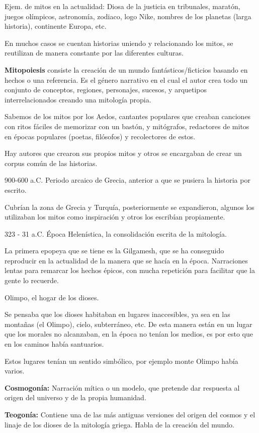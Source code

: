 Ejem. de mitos en la actualidad: Diosa de la justicia en tribunales, maratón, juegos olímpicos, astronomía, zodiaco, logo Nike, nombres de los planetas (larga historia), continente Europa, etc.

En muchos casos se cuentan historias uniendo y relacionando los mitos, se reutilizan de manera constante por las diferentes culturas.

\textbf{Mitopoiesis} consiste la creación de un mundo fantásticos/ficticios basando en hechos o una referencia. Es el género narrativo en el cual el autor crea todo un conjunto de conceptos, regiones, personajes, sucesos, y arquetipos interrelacionados creando una mitología propia.

Sabemos de los mitos por los Aedos, cantantes populares que creaban canciones con ritos fáciles de memorizar con un bastón, y mitógrafos, redactores de mitos en épocas populares (poetas, filósofos) y recolectores de estos.

Hay autores que crearon sus propios mitos y otros se encargaban de crear un corpus común de las historias.

900-600 a.C. Periodo arcaico de Grecia, anterior a que se pusiera la historia por escrito.

Cubrían la zona de Grecia y Turquía, posteriormente se expandieron, algunos los utilizaban los mitos como inspiración y otros los escribían propiamente.

323 - 31 a.C. Época Helenística, la consolidación escrita de la mitología.

La primera epopeya que se tiene es la Gilgamesh, que se ha conseguido reproducir en la actualidad de la manera que se hacía en la época. Narraciones lentas para remarcar los hechos épicos, con mucha repetición para facilitar que la gente lo recuerde.

Olimpo, el hogar de los dioses.

Se pensaba que los dioses habitaban en lugares inaccesibles, ya sea en las montañas (el Olimpo), cielo, subterráneo, etc. De esta manera están en un lugar que los morales no alcanzaban, en la época no tenían los medios, es por esto que en los caminos había santuarios.

Estos lugares tenían un sentido simbólico, por ejemplo monte Olimpo había varios.

\textbf{Cosmogonía:} Narración mítica o un modelo, que pretende dar respuesta al origen del universo y de la propia humanidad.

\textbf{Teogonía:} Contiene una de las más antiguas versiones del origen del cosmos y el linaje de los dioses de la mitología griega. Habla de la creación del mundo.

